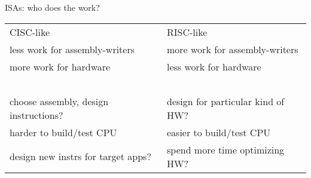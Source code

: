 
\begin{frame}[fragile,label=isasWhoWork]{ISAs: who does the work?}
    \begin{tabular}{ll}
CISC-like & RISC-like \\
    less work for assembly-writers & more work for assembly-writers  \\
    more work for hardware  & less work for hardware  \\
    ~ & ~ \\
choose assembly, design instructions? & design for particular kind of HW? \\
harder to build/test CPU  & easier to build/test CPU  \\
design new instrs for target apps? & spend more time optimizing HW? \\
\end{tabular}
\end{frame}
